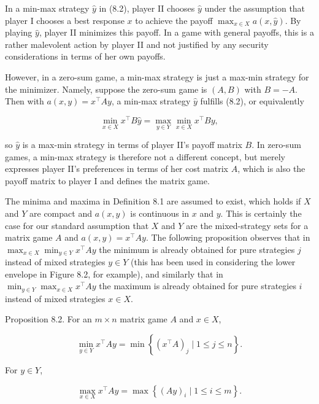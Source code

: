 \documentclass[12pt]{article}
\begin{document}
In a min-max strategy $\hat{y}$ in (8.2), player II chooses $\hat{y}$ under the assumption that player I chooses a best response $x$ to achieve the payoff $\max _{x \in X} a(x, \hat{y})$. By playing $\hat{y}$, player II minimizes this payoff. In a game with general payoffs, this is a rather malevolent action by player II and not justified by any security considerations in terms of her own payoffs.

However, in a zero-sum game, a min-max strategy is just a max-min strategy for the minimizer. Namely, suppose the zero-sum game is $(A, B)$ with $B=-A$. Then with $a(x, y)=x^{\top} A y$, a min-max strategy $\hat{y}$ fulfills (8.2), or equivalently

$$
\min _{x \in X} x^{\top} B \hat{y}=\max _{y \in Y} \min _{x \in X} x^{\top} B y,
$$

so $\hat{y}$ is a max-min strategy in terms of player II's payoff matrix $B$. In zero-sum games, a min-max strategy is therefore not a different concept, but merely expresses player II's preferences in terms of her cost matrix $A$, which is also the payoff matrix to player I and defines the matrix game.

The minima and maxima in Definition 8.1 are assumed to exist, which holds if $X$ and $Y$ are compact and $a(x, y)$ is continuous in $x$ and $y$. This is certainly the\\
case for our standard assumption that $X$ and $Y$ are the mixed-strategy sets for a matrix game $A$ and $a(x, y)=x^{\top} A y$. The following proposition observes that in $\max _{x \in X} \min _{y \in Y} x^{\top} A y$ the minimum is already obtained for pure strategies $j$ instead of mixed strategies $y \in Y$ (this has been used in considering the lower envelope in Figure 8.2, for example), and similarly that in $\min _{y \in Y} \max _{x \in X} x^{\top} A y$ the maximum is already obtained for pure strategies $i$ instead of mixed strategies $x \in X$.

Proposition 8.2. For an $m \times n$ matrix game $A$ and $x \in X$,


\begin{equation*}
\min _{y \in Y} x^{\top} A y=\min \left\{\left(x^{\top} A\right)_{j} \mid 1 \leq j \leq n\right\} . \tag{8.3}
\end{equation*}


For $y \in Y$,


\begin{equation*}
\max _{x \in X} x^{\top} A y=\max \left\{(A y)_{i} \mid 1 \leq i \leq m\right\} . \tag{8.4}
\end{equation*}
\end{document}
